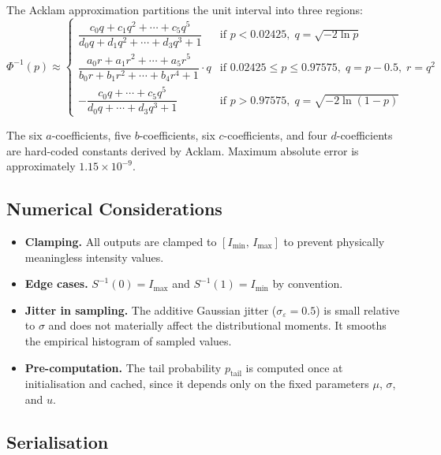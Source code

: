 \documentclass[11pt,a4paper]{article}
\begin{document}
The Acklam approximation partitions the unit interval into three regions:
\begin{equation}
    \Phi^{-1}(p) \approx
    \begin{cases}
        \dfrac{c_0 q + c_1 q^2 + \cdots + c_5 q^5}{d_0 q + d_1 q^2 + \cdots + d_3 q^3 + 1}
            & \text{if } p < 0.02425, \; q = \sqrt{-2\ln p} \\[10pt]
        \dfrac{a_0 r + a_1 r^2 + \cdots + a_5 r^5}{b_0 r + b_1 r^2 + \cdots + b_4 r^4 + 1} \cdot q
            & \text{if } 0.02425 \le p \le 0.97575, \; q = p - 0.5,\; r = q^2 \\[10pt]
        -\dfrac{c_0 q + \cdots + c_5 q^5}{d_0 q + \cdots + d_3 q^3 + 1}
            & \text{if } p > 0.97575, \; q = \sqrt{-2\ln(1-p)}
    \end{cases}
    \label{eq:acklam}
\end{equation}

\noindent The six $a$-coefficients, five $b$-coefficients, six $c$-coefficients, and
four $d$-coefficients are hard-coded constants derived by Acklam. Maximum absolute
error is approximately $1.15 \times 10^{-9}$.

\subsection{Numerical Considerations}

\begin{itemize}[nosep]
    \item \textbf{Clamping.} All outputs are clamped to $[I_{\min},\, I_{\max}]$ to
          prevent physically meaningless intensity values.
    \item \textbf{Edge cases.} $S^{-1}(0) = I_{\max}$ and $S^{-1}(1) = I_{\min}$
          by convention.
    \item \textbf{Jitter in sampling.} The additive Gaussian jitter
          ($\sigma_\varepsilon = 0.5$) is small relative to $\sigma$ and does not
          materially affect the distributional moments. It smooths the empirical
          histogram of sampled values.
    \item \textbf{Pre-computation.} The tail probability $p_{\text{tail}}$ is computed
          once at initialisation and cached, since it depends only on the fixed
          parameters $\mu$, $\sigma$, and $u$.
\end{itemize}

\subsection{Serialisation}
\end{document}
